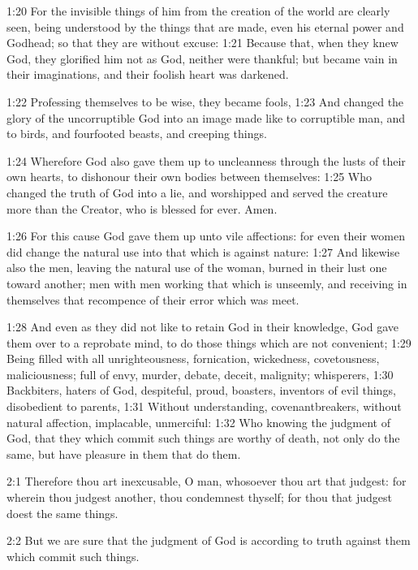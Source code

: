 1:20 For the invisible things of him from the creation of the world are clearly seen, being understood by the things that are made, even his eternal power and Godhead; so that they are without excuse: 1:21 Because that, when they knew God, they glorified him not as God, neither were thankful; but became vain in their imaginations, and their foolish heart was darkened.

1:22 Professing themselves to be wise, they became fools, 1:23 And changed the glory of the uncorruptible God into an image made like to corruptible man, and to birds, and fourfooted beasts, and creeping things.

1:24 Wherefore God also gave them up to uncleanness through the lusts of their own hearts, to dishonour their own bodies between themselves: 1:25 Who changed the truth of God into a lie, and worshipped and served the creature more than the Creator, who is blessed for ever.  Amen.

1:26 For this cause God gave them up unto vile affections: for even their women did change the natural use into that which is against nature: 1:27 And likewise also the men, leaving the natural use of the woman, burned in their lust one toward another; men with men working that which is unseemly, and receiving in themselves that recompence of their error which was meet.

1:28 And even as they did not like to retain God in their knowledge, God gave them over to a reprobate mind, to do those things which are not convenient; 1:29 Being filled with all unrighteousness, fornication, wickedness, covetousness, maliciousness; full of envy, murder, debate, deceit, malignity; whisperers, 1:30 Backbiters, haters of God, despiteful, proud, boasters, inventors of evil things, disobedient to parents, 1:31 Without understanding, covenantbreakers, without natural affection, implacable, unmerciful: 1:32 Who knowing the judgment of God, that they which commit such things are worthy of death, not only do the same, but have pleasure in them that do them.

2:1 Therefore thou art inexcusable, O man, whosoever thou art that judgest: for wherein thou judgest another, thou condemnest thyself; for thou that judgest doest the same things.

2:2 But we are sure that the judgment of God is according to truth against them which commit such things.

